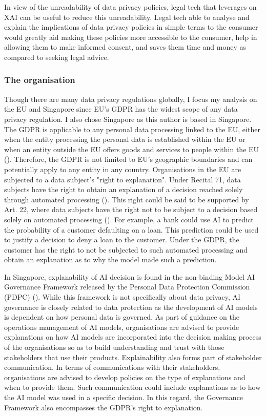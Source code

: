 In view of the unreadability of data privacy policies, legal tech that leverages on XAI can be useful to reduce this unreadability. Legal tech able to analyse and explain the implications of data privacy policies in simple terms to the consumer would greatly aid making these policies more accessible to the consumer, help in allowing them to make informed consent, and saves them time and money as compared to seeking legal advice.

\subsubsection{The organisation}
Though there are many data privacy regulations globally, I focus my analysis on the EU and Singapore since EU's GDPR has the widest scope of any data privacy regulation. I also chose Singapore as this author is based in Singapore. The GDPR is applicable to any personal data processing linked to the EU, either when the entity processing the personal data is established within the EU or when an entity outside the EU offers goods and services to people within the EU (\cite{gdpr_art3}). Therefore, the GDPR is not limited to EU's geographic boundaries and can potentially apply to any entity in any country. Organisations in the EU are subjected to a data subject's "right to explanation". Under Recital 71, data subjects have the right to obtain an explanation of a decision reached solely through automated processing (\cite{gdpr_recital71}). This right could be said to be supported by Art. 22, where data subjects have the right not to be subject to a decision based solely on automated processing (\cite{gdpr_art22}). For example, a bank could use AI to predict the probability of a customer defaulting on a loan. This prediction could be used to justify a decision to deny a loan to the customer. Under the GDPR, the customer has the right to not be subjected to such automated processing and obtain an explanation as to why the model made such a prediction.

In Singapore, explanability of AI decision is found in the non-binding Model AI Governance Framework released by the Personal Data Protection Commission (PDPC) (\cite{ai_modelframework}). While this framework is not specifically about data privacy, AI governance is closely related to data protection as the development of AI models is dependent on how personal data is governed. As part of guidance on the operations management of AI models, organisations are advised to provide explanations on how AI models are incorporated into the decision making process of the organisations so as to build understanding and trust with those stakeholders that use their products. Explainability also forms part of stakeholder communication. In terms of communications with their stakeholders, organisations are advised to develop policies on the type of explanations and when to provide them. Such communication could include explanations as to how the AI model was used in a specific decision. In this regard, the Governance Framework also encompasses the GDPR's right to explanation.

